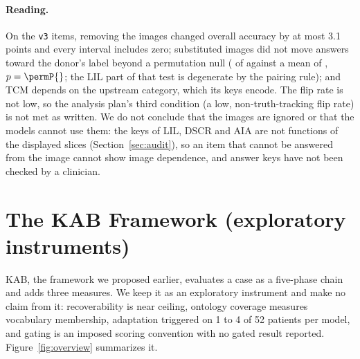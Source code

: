 \documentclass[11pt]{article}
\begin{document}
\paragraph{Reading.} On the \texttt{v3} items, removing the images changed overall accuracy by at most 3.1 points and every interval includes zero; substituted images did not move answers toward the donor\textquoteright s label beyond a permutation null (\permObserved{} of \permN{} against a mean of \permMean{}, $p=\permP{}$; the LIL part of that test is degenerate by the pairing rule); and TCM depends on the upstream category, which its keys encode. The flip rate is not low, so the analysis plan\textquoteright s third condition (a low, non-truth-tracking flip rate) is not met as written. We do not conclude that the images are ignored or that the models cannot use them: the keys of LIL, DSCR and AIA are not functions of the displayed slices (Section~\ref{sec:audit}), so an item that cannot be answered from the image cannot show image dependence, and answer keys have not been checked by a clinician.


\section{The KAB Framework (exploratory instruments)}
\label{sec:kab}

KAB, the framework we proposed earlier, evaluates a case as a five-phase chain and adds three measures. We keep it as an exploratory instrument and make no claim from it: recoverability is near ceiling, ontology coverage measures vocabulary membership, adaptation triggered on 1 to 4 of 52 patients per model, and gating is an imposed scoring convention with no gated result reported. Figure~\ref{fig:overview} summarizes it.
\end{document}
